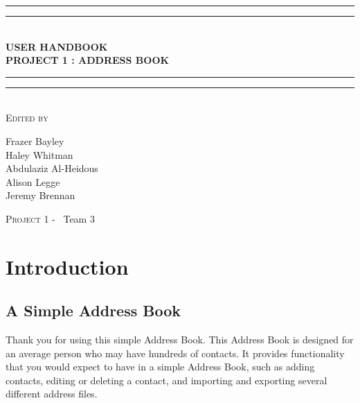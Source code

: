 \documentclass[a4paper, 11pt]{article}
\newlength{\drop}
\begin{document}
  
  
  \begin{titlepage}
    \textheight
    \centering
    \vspace*{\baselineskip}
    \rule{\textwidth}{1.6pt}\vspace*{-\baselineskip}\vspace*{2pt}
    \rule{\textwidth}{0.4pt}\\[\baselineskip]
    {\LARGE \textbf{USER HANDBOOK \\ PROJECT 1 : ADDRESS BOOK}}\\[0.2\baselineskip]
    \rule{\textwidth}{0.4pt}\vspace*{-\baselineskip}\vspace{3.2pt}
    \rule{\textwidth}{1.6pt}\\[\baselineskip]
    \scshape
    \vspace*{2\baselineskip}
    Edited by \\[\baselineskip]
    {\Large Frazer Bayley \\ Haley Whitman \\ Abdulaziz Al-Heidous \\ Alison Legge \\ Jeremy Brennan\par}

    \vfill
    {\scshape \LARGE Project 1 -} \        {\LARGE Team 3}\par
  \end{titlepage}


\tableofcontents
\vspace*{25\baselineskip}
\begin{versionhistory}
\end{versionhistory}
\pagebreak


\section{Introduction}
\subsection{A Simple Address Book}
Thank you for using this simple Address Book. This Address Book is designed for an average person who may have hundreds of contacts. It provides functionality that you would expect to have in a simple Address Book, such as adding contacts, editing or deleting a contact, and importing and exporting several different address files.
\end{document}
